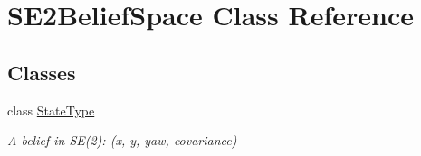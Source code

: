 \hypertarget{class_s_e2_belief_space}{\section{\-S\-E2\-Belief\-Space \-Class \-Reference}
\label{class_s_e2_belief_space}
}
\subsection*{\-Classes}
\begin{DoxyCompactItemize}
\item 
class \hyperlink{class_s_e2_belief_space_1_1_state_type}{\-State\-Type}
\begin{DoxyCompactList}\small\item\em \-A belief in \-S\-E(2)\-: (x, y, yaw, covariance) \end{DoxyCompactList}\end{DoxyCompactItemize}
